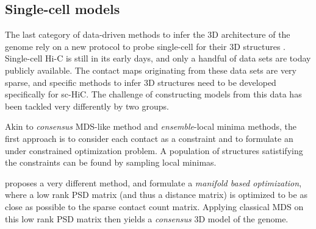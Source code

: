 \documentclass[letterpaper,12pt]{article}
\begin{document}
\subsection*{Single-cell models}

The last category of data-driven methods to infer the 3D architecture of the
genome rely on a new protocol to probe single-cell for their 3D structures
\citep{nagano:single-cell,ramani:massively}. Single-cell Hi-C is still in its early days,
and only a handful of data sets are today publicly available. The contact maps
originating from these data sets are very sparse, and specific methods to
infer 3D structures need to be developed specifically for sc-HiC. The
challenge of constructing models from this data has been tackled very
differently by two groups. 

Akin to {\em consensus} MDS-like method and {\em ensemble}-local minima
methods,  the first approach is to consider each contact as a constraint and
to formulate an under constrained optimization problem. A population of
structures satistifying the constraints can be found by sampling local
minimas.

\citet{paulsen:manifold} proposes a very different method, and formulate a
\textit{manifold based optimization}, where a low rank PSD matrix (and thus a
distance matrix) is optimized to be as close as possible to the sparse contact
count matrix. Applying classical MDS on this low rank PSD matrix then yields a
\textit{consensus} 3D model of the genome.
\end{document}
